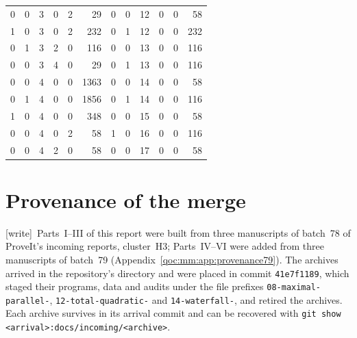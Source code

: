 \documentclass[11pt,letterpaper]{article}
\theoremstyle{definition}
\theoremstyle{remark}
\newcommand{\wtag}{\textup{[write]}}
\begin{document}
\begin{center}
\begin{longtable}{@{}rr rrr r @{\qquad} rr rrr r@{}}
0 & 0 & 3 & 0 & 2 & 29 & 0 & 0 & 12 & 0 & 0 & 58\\
1 & 0 & 3 & 0 & 2 & 232 & 0 & 1 & 12 & 0 & 0 & 232\\
0 & 1 & 3 & 2 & 0 & 116 & 0 & 0 & 13 & 0 & 0 & 116\\
0 & 0 & 3 & 4 & 0 & 29 & 0 & 1 & 13 & 0 & 0 & 116\\
0 & 0 & 4 & 0 & 0 & 1363 & 0 & 0 & 14 & 0 & 0 & 58\\
0 & 1 & 4 & 0 & 0 & 1856 & 0 & 1 & 14 & 0 & 0 & 116\\
1 & 0 & 4 & 0 & 0 & 348 & 0 & 0 & 15 & 0 & 0 & 58\\
0 & 0 & 4 & 0 & 2 & 58 & 1 & 0 & 16 & 0 & 0 & 116\\
0 & 0 & 4 & 2 & 0 & 58 & 0 & 0 & 17 & 0 & 0 & 58\\
\bottomrule
\end{longtable}\end{center}


\section{Provenance of the merge}\label{qoc:app:provenance}

\wtag\ Parts~I--III of this report were built from three manuscripts of batch~78 of ProveIt's incoming reports, cluster~H3; Parts~IV--VI were added from three manuscripts of batch~79 (Appendix~\ref{qoc:mm:app:provenance79}). The archives arrived in the repository's  directory and were placed in commit \texttt{41e7f1189}, which staged their programs, data and audits under the file prefixes \texttt{08-maximal-parallel-}, \texttt{12-total-quadratic-} and \texttt{14-waterfall-}, and retired the archives. Each archive survives in its arrival commit and can be recovered with \texttt{git show <arrival>:docs/incoming/<archive>}.
\end{document}

